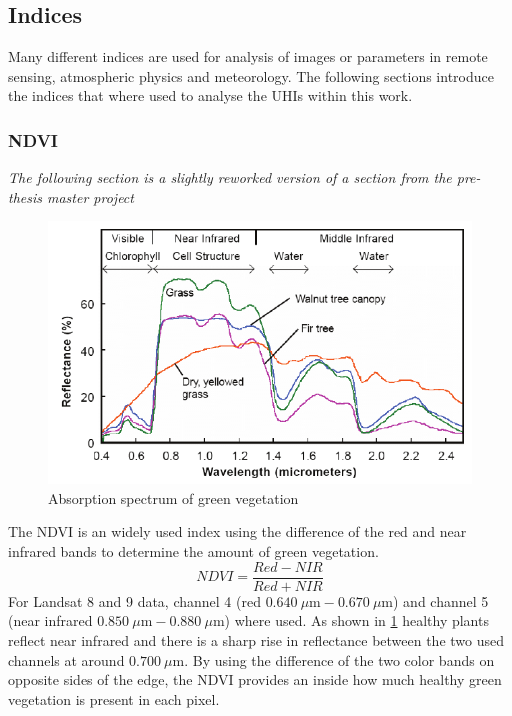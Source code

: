 \subsection{Indices}
Many different indices are used for analysis of images or parameters in remote sensing, atmospheric physics and meteorology.
The following sections introduce the indices that where used to analyse the \glspl{UHI} within this work. 
\subsubsection{NDVI}
\textit{The following section is a slightly reworked version of a section from the pre-thesis master project}~\autocite[see]{andrae2023}\\ 
%
\noindent
\begin{figure}[!htbp]
    \centering
    \includegraphics[width=\textwidth]{img/Reflectance-spectra-of-different-types-of-green-vegetation-compared-to-a-spectral.png}
    \caption{Absorption spectrum of green vegetation \autocite[P. 5]{Smith2012}\label{fig:absorbtionVeg}}
\end{figure}
The \gls{NDVI} is an widely used index using the difference of the red and near infrared bands to determine the amount of green vegetation. 
\begin{equation}
    NDVI = \frac{Red-NIR}{Red+NIR}
    \label{equ:ndvi}
\end{equation}
For Landsat 8 and 9 data, channel 4 (red $0.640\ \mu \text{m} - 0.670\ \mu \text{m}$) and channel 5 (near infrared $0.850\ \mu \text{m} - 0.880\ \mu \text{m}$) where used.
As shown in \cref{fig:absorbtionVeg} healthy plants reflect near infrared and there is a sharp rise in reflectance between the two used channels at around $0.700\ \mu \text{m}$. 
By using the difference of the two color bands on opposite sides of the edge, the NDVI provides an inside how much healthy green vegetation is present in each pixel.
%

